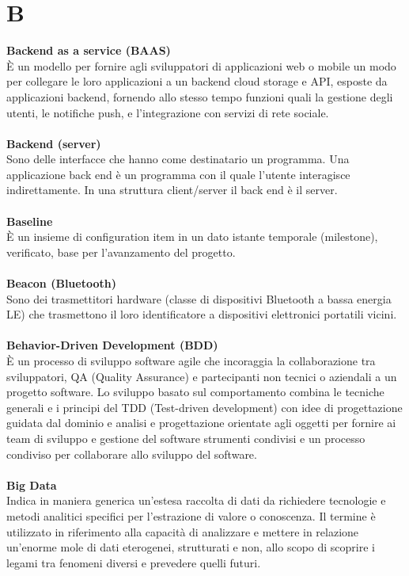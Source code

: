 \section{B}
\textbf{Backend as a service (BAAS)}\\
È un modello per fornire agli sviluppatori di applicazioni web o mobile un modo per collegare le loro applicazioni a un backend cloud storage e API, esposte da applicazioni backend, fornendo allo stesso tempo funzioni quali la gestione degli utenti, le notifiche push, e l'integrazione con servizi di rete sociale. \\ \\
\textbf{Backend (server)}\\
Sono delle interfacce che hanno come destinatario un programma. Una applicazione back end è un programma con il quale l'utente interagisce indirettamente. In una struttura client/server il back end è il server. \\ \\
\textbf{Baseline}\\
È un insieme di configuration item in un dato istante temporale (milestone), verificato, base per l'avanzamento del progetto. \\ \\
\textbf{Beacon (Bluetooth)}\\
Sono dei trasmettitori hardware (classe di dispositivi Bluetooth a bassa energia LE) che trasmettono il loro identificatore a dispositivi elettronici portatili vicini. \\ \\
\textbf{Behavior-Driven Development (BDD)}\\
È un processo di sviluppo software agile che incoraggia la collaborazione tra sviluppatori, QA (Quality Assurance) e partecipanti non tecnici o aziendali a un progetto software. Lo sviluppo basato sul comportamento combina le tecniche generali e i principi del TDD (Test-driven development) con idee di progettazione guidata dal dominio e analisi e progettazione orientate agli oggetti per fornire ai team di sviluppo e gestione del software strumenti condivisi e un processo condiviso per collaborare allo sviluppo del software. \\ \\
\textbf{Big Data}\\
Indica in maniera generica un'estesa raccolta di dati da richiedere tecnologie e metodi analitici specifici per l'estrazione di valore o conoscenza. Il termine è utilizzato in riferimento alla capacità di analizzare  e mettere in relazione un'enorme mole di dati eterogenei, strutturati e non, allo scopo di scoprire i legami tra fenomeni diversi e prevedere quelli futuri. \\ \\
